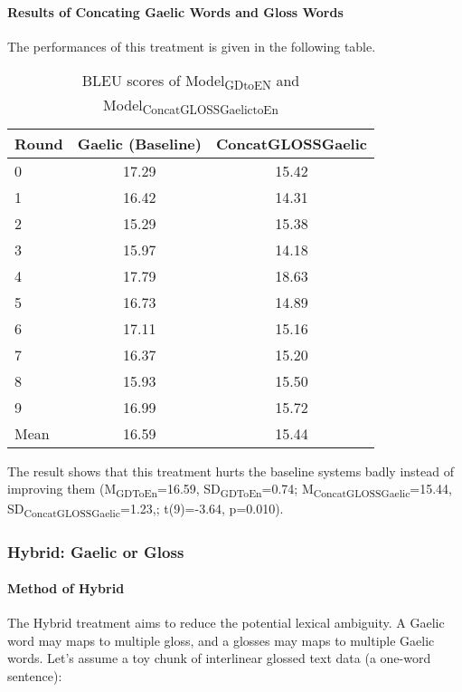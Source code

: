 \documentclass[a4paper]{article}
\begin{document}
\paragraph{Results of Concating Gaelic Words and Gloss Words}
The performances of this treatment is given in the following table.
\begin{table}[ht]
\centering
\begin{tabular}{lcc}
  \hline
Round & Gaelic (Baseline) & ConcatGLOSSGaelic \\ 
  \hline
0 & 17.29 & 15.42 \\ 
  1 & 16.42 & 14.31 \\ 
  2 & 15.29 & 15.38 \\ 
  3 & 15.97 & 14.18 \\ 
  4 & 17.79 & 18.63 \\ 
  5 & 16.73 & 14.89 \\ 
  6 & 17.11 & 15.16 \\ 
  7 & 16.37 & 15.20 \\ 
  8 & 15.93 & 15.50 \\ 
  9 & 16.99 & 15.72 \\ 
   \hline
Mean & 16.59 & 15.44 \\ 
   \hline
\end{tabular}
\caption{BLEU scores of Model\textsubscript{GDtoEN} and Model\textsubscript{ConcatGLOSSGaelictoEn} } 
\label{Table:Concating}
\end{table}\newline
The result shows that this treatment hurts the baseline systems badly instead of improving them (M\textsubscript{GDToEn}=16.59, SD\textsubscript{GDToEn}=0.74; M\textsubscript{ConcatGLOSSGaelic}=15.44, SD\textsubscript{ConcatGLOSSGaelic}=1.23,; t(9)=-3.64, p=0.010).

\subsubsection{Hybrid: Gaelic or Gloss}
\paragraph{Method of Hybrid}
The Hybrid treatment aims to reduce the potential lexical ambiguity. A Gaelic word may maps to multiple gloss, and a glosses may maps to multiple Gaelic words. Let's assume a toy chunk of interlinear glossed text data (a one-word sentence): 
\end{document}
